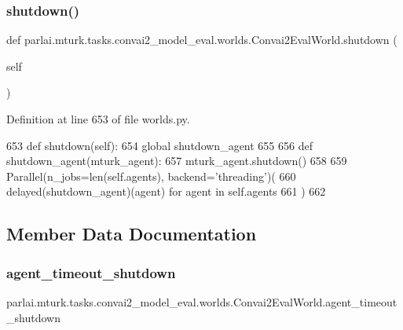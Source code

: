 \subsubsection{\texorpdfstring{shutdown()}{shutdown()}}
{\footnotesize\ttfamily def parlai.\+mturk.\+tasks.\+convai2\+\_\+model\+\_\+eval.\+worlds.\+Convai2\+Eval\+World.\+shutdown (\begin{DoxyParamCaption}\item[{}]{self }\end{DoxyParamCaption})}



Definition at line 653 of file worlds.\+py.


\begin{DoxyCode}
653     \textcolor{keyword}{def }shutdown(self):
654         \textcolor{keyword}{global} shutdown\_agent
655 
656         \textcolor{keyword}{def }shutdown\_agent(mturk\_agent):
657             mturk\_agent.shutdown()
658 
659         Parallel(n\_jobs=len(self.agents), backend=\textcolor{stringliteral}{'threading'})(
660             delayed(shutdown\_agent)(agent) \textcolor{keywordflow}{for} agent \textcolor{keywordflow}{in} self.agents
661         )
662 \end{DoxyCode}


\subsection{Member Data Documentation}
\mbox{\label{classparlai_1_1mturk_1_1tasks_1_1convai2__model__eval_1_1worlds_1_1Convai2EvalWorld_abb5303f4898bce84f4404b677cb02163}} 
\subsubsection{\texorpdfstring{agent\+\_\+timeout\+\_\+shutdown}{agent\_timeout\_shutdown}}
{\footnotesize\ttfamily parlai.\+mturk.\+tasks.\+convai2\+\_\+model\+\_\+eval.\+worlds.\+Convai2\+Eval\+World.\+agent\+\_\+timeout\+\_\+shutdown}



